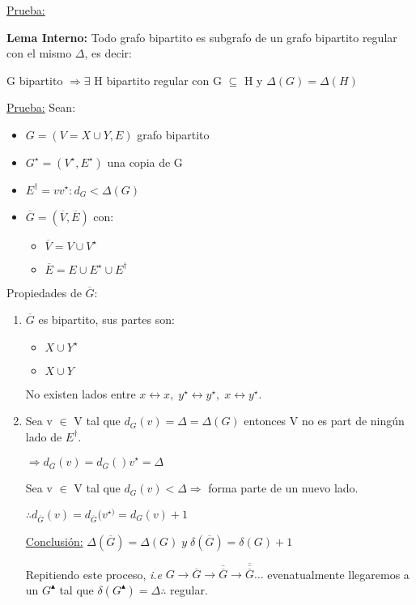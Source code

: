 \documentclass[12pt,a4paper]{report}
\begin{document}
		\underline{Prueba:} 
		
		\textbf{Lema Interno:} Todo grafo bipartito es subgrafo de un grafo bipartito regular con el mismo $\Delta$, es decir:
		
		\begin{center}
			G bipartito $\Rightarrow \exists$ H bipartito regular con G $\subseteq$ H y $\Delta(G) = \Delta(H)$ 
		\end{center}
		
		\underline{Prueba:} Sean:
		
		\begin{itemize}
			\item $G = (V = X \cup Y, E)$ grafo bipartito
			\item $G^{\star} = (V^{\star}, E^{\star})$ una copia de G
			\item $E^{\dag} = {vv^{\star} : d_{G} < \Delta(G)}$
			\item $\overline{G} = (\overline{V}, \overline{E})$ con:
				\begin{itemize}
					\item $\overline{V} = V \cup V^{\star}$
					\item $\overline{E} = E \cup E^{\star} \cup E^{\dag}$
				\end{itemize}
		\end{itemize}
		
		Propiedades de $\overline{G}$:
		\begin{enumerate}
			\item $\overline{G}$ es bipartito, sus partes son:
				\begin{itemize}
					\item $X \cup Y^{\star}$
					\item $X \cup Y$
				\end{itemize}
				
			No existen lados entre $x \leftrightarrow x, \; y^{\star} \leftrightarrow y^{\star}, \; x \leftrightarrow y^{\star}$.
			
			\item Sea v $\in$ V tal que $d_{G}(v) = \Delta = \Delta(G)$ entonces V no es part de ningún lado de $E^{\dag}$.
			
			$\Rightarrow d_{\overline{G}}(v) = d_{\overline{G}}()v^{\star} = \Delta$ 
			
			\vspace{5mm}
			Sea v $\in$ V tal que $d_{G}(v) < \Delta \Rightarrow$ forma parte de un nuevo lado. 
			
			$\therefore d_{\overline{G}}(v) = d_{\overline{G}}(v^{\star)} = d_{G}(v) + 1$
			
			\underline{Conclusión:} $ \Delta(\overline{G}) = \Delta(G) \; y \; \delta(\overline{G}) = \delta(G) + 1$
			
			Repitiendo este proceso, \textit{i.e} $G \rightarrow \overline{G} \rightarrow \overline{\overline{G}} \rightarrow \overline{\overline{\overline{G}}} \dotsc $ evenatualmente llegaremos a un $G^{\blacktriangle}$ tal que $\delta(G^{\blacktriangle}) = \Delta \therefore$ regular.
		\end{enumerate}
		
\end{document}
